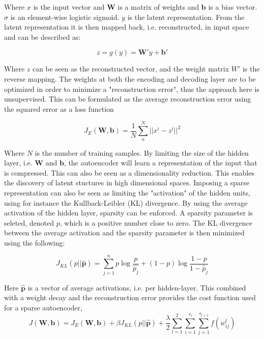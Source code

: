 \documentclass{article}
\begin{document}
Where $x$ is the input vector and $\mathbf{W}$ is a matrix of weights and $\mathbf{b}$ is a bias vector. $\sigma$ is an element-wise logistic sigmoid. $y$ is the latent representation. From the latent representation it is then mapped back, i.e. reconstructed, in input space and can be described as:

\begin{equation}
z = g(y) = \mathbf{W'}y + \mathbf{b'}
\end{equation}

Where $z$ can be seen as the reconstructed vector, and the weight matrix $W'$ is the reverse mapping. The weights at both the encoding and decoding layer are to be optimized in order to minimize a "reconstruction error", thus the approach here is unsupervised. This can be formulated as the average reconstruction error using the squared error as a loss function

\begin{equation}
J_E(\mathbf{W},\mathbf{b}) = \frac{1}{N} \sum_n^N || x^i - z^i || ^2
\end{equation}

Where $N$ is the number of training samples. By limiting the size of the hidden layer, i.e. $\mathbf{W}$ and $\mathbf{b}$, the autoencoder will learn a representation of the input that is compressed. This can also be seen as a dimensionality reduction. This enables the discovery of latent stuctures in high dimensional spaces. 
Imposing a sparse representation can also be seen as limiting the "activation" of the hidden units, using for instance the Kullback-Leibler (KL) divergence. By using the average activation of the hidden layer, sparsity can be enforced. A sparsity parameter is seleted, denoted $p$, which is a positive number close to zero. The KL divergence between the average activation and the sparsity parameter is then minimized using the following:

\begin{equation}
\label{eq:sparse}
  J_{KL}(p || \hat{\mathbf{p}}) = \sum_{j=1}^n p \log\frac{p}{\hat{p_{j}}} + (1-p) \log\frac{1-p}{1-\hat{p}_j}
\end{equation} 

Here $\hat{\mathbf{p}}$ is a vector of average activations, i.e. per hidden-layer. This combined with a weight decay and the reconstruction error provides the cost function used for a sparse autoencoder, \cite{Hosseini-Asl2016}
\begin{equation}\label{eq:lossfunc}
J(\mathbf{W},\mathbf{b}) = J_E(\mathbf{W},\mathbf{b}) + \beta J_{KL}(p || \hat{\mathbf{p}}) + \frac{\lambda}{2}\sum_{l=1}^2\sum_{i=1}^{s_l}\sum_{j=1}^{s_{l+1}} f(w_{ij}^{l})
\end{equation}
\end{document}
